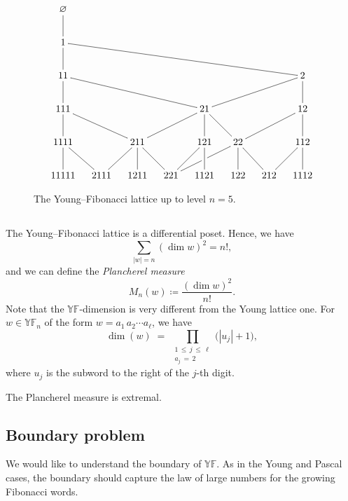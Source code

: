 \documentclass[letterpaper,11pt,oneside,reqno]{article}
\numberwithin{equation}{section}
\theoremstyle{definition}
\begin{document}
\begin{figure}[htpb]
	\centering
	\begin{equation*}
		\xymatrixrowsep{0.3in}
		\xymatrixcolsep{0.15in}
		\xymatrix{ \varnothing \ar@{-}[d] & & & & & & &  \\
		1 \ar@{-}[d] \ar@{-}[drrrrrrr] & & & & & & & \\
		11  \ar@{-}[d] \ar@{-}[drrrr] & & & & & & & 2  \ar@{-}[d] \ar@{-}[dlll] \\
		111  \ar@{-}[d] \ar@{-}[drr] & & & & 21 \ar@{-}[d] \ar@{-}[dll] \ar@{-}[dr] & & & 12  \ar@{-}[d] \ar@{-}[dll] \\
		1111  \ar@{-}[d] \ar@{-}[dr]  & &211  \ar@{-}[d] \ar@{-}[dl] \ar@{-}[dr] & &121 \ar@{-}[d] \ar@{-}[dl]  &22 \ar@{-}[d] \ar@{-}[dll]|\hole \ar@{-}[dr]
		& &112  \ar@{-}[d] \ar@{-}[dl]  \\
		11111 & 2111 & 1211 & 221 & 1121 & 122 & 212 & 1112 }
	\end{equation*}
	\caption{The Young--Fibonacci lattice up to level $n=5$.}
	\label{fig:YF_lattice}
\end{figure}

\subsection{}

The Young--Fibonacci lattice is a differential poset. Hence, we have
\begin{equation*}
	\sum_{|w|=n}(\dim w)^2=n!,
\end{equation*}
and we can define the \emph{Plancherel measure}
\begin{equation*}
	M_n(w)\coloneqq \frac{(\dim w)^2}{n!}.
\end{equation*}
Note that the $\mathbb{YF}$-dimension is very
different from the Young lattice one.
For $w \in \mathbb{YF}_n$ of the form
$w = a_1 \, a_2 \cdots a_\ell$, we have
\[
\dim(w)
\;=\;
\prod_{\substack{1 \,\leq\, j \,\leq\, \ell \\ a_j \,=\, 2}}
\bigl( |u_j| + 1 \bigr),
\]
where $u_j$ is the subword to the right of the $j$-th digit.

The Plancherel measure is extremal.

\subsection{Boundary problem}

We would like to understand the boundary of $\mathbb{YF}$.
As in the Young and Pascal cases, the boundary should capture the law of
large numbers for the growing Fibonacci words.
\end{document}
